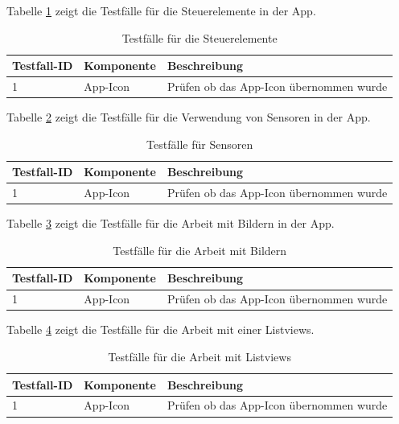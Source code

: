 Tabelle \ref{tab:Controls} zeigt die Testfälle für die Steuerelemente in der App. 

\begin{table}[!ht]
\begin{tabularx}{\textwidth}{l|l|X}
   \textbf{Testfall-ID} & \textbf{Komponente} & \textbf{Beschreibung} \\
\hline
1             & App-Icon           	& Prüfen ob das App-Icon übernommen wurde                      			 \\ 
\end{tabularx}
\caption{Testfälle für die Steuerelemente}
 \label{tab:Controls}
\end{table}

Tabelle \ref{tab:Sensoren} zeigt die Testfälle für die Verwendung von Sensoren in der App. 

\begin{table}[!ht]
\begin{tabularx}{\textwidth}{l|l|X}
   \textbf{Testfall-ID} & \textbf{Komponente} & \textbf{Beschreibung} \\
\hline
1             & App-Icon           	& Prüfen ob das App-Icon übernommen wurde                      			 \\ 
\end{tabularx}
\caption{Testfälle für Sensoren}
 \label{tab:Sensoren}
\end{table}


Tabelle \ref{tab:Images} zeigt die Testfälle für die Arbeit mit Bildern in der App. 

\begin{table}[!ht]
\begin{tabularx}{\textwidth}{l|l|X}
   \textbf{Testfall-ID} & \textbf{Komponente} & \textbf{Beschreibung} \\
\hline
1             & App-Icon           	& Prüfen ob das App-Icon übernommen wurde                      			 \\ 
\end{tabularx}
\caption{Testfälle für die Arbeit mit Bildern}
 \label{tab:Images}
\end{table}


Tabelle \ref{tab:Listview} zeigt die Testfälle für die Arbeit mit einer Listviews. 

\begin{table}[!ht]
\begin{tabularx}{\textwidth}{l|l|X}
   \textbf{Testfall-ID} & \textbf{Komponente} & \textbf{Beschreibung} \\
\hline
1             & App-Icon           	& Prüfen ob das App-Icon übernommen wurde                      			 \\ 
\end{tabularx}
\caption{Testfälle für die Arbeit mit Listviews}
 \label{tab:Listview}
\end{table}


